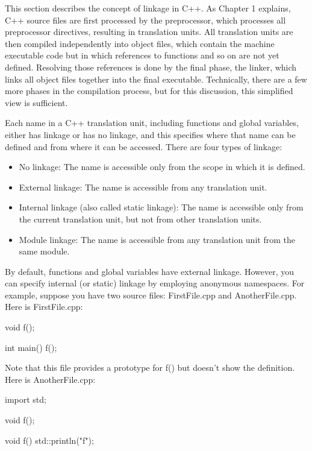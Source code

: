 
This section describes the concept of linkage in C++. As Chapter 1 explains, C++ source files are first processed by the preprocessor, which processes all preprocessor directives, resulting in translation units. All translation units are then compiled independently into object files, which contain the machine executable code but in which references to functions and so on are not yet defined. Resolving those references is done by the final phase, the linker, which links all object files together into the final executable. Technically, there are a few more phases in the compilation process, but for this discussion, this simplified view is sufficient.

Each name in a C++ translation unit, including functions and global variables, either has linkage or has no linkage, and this specifies where that name can be defined and from where it can be accessed. There are four types of linkage:

\begin{itemize}
\item
No linkage: The name is accessible only from the scope in which it is defined.

\item
External linkage: The name is accessible from any translation unit.

\item
Internal linkage (also called static linkage): The name is accessible only from the current translation unit, but not from other translation units.

\item
Module linkage: The name is accessible from any translation unit from the same module.
\end{itemize}


By default, functions and global variables have external linkage. However, you can specify internal (or static) linkage by employing anonymous namespaces. For example, suppose you have two source files: FirstFile.cpp and AnotherFile.cpp. Here is FirstFile.cpp:

\begin{cpp}
void f();

int main()
{
    f();
}
\end{cpp}

Note that this file provides a prototype for f() but doesn’t show the definition. Here is AnotherFile.cpp:

\begin{cpp}
import std;

void f();

void f()
{
    std::println("f");
}
\end{cpp}

